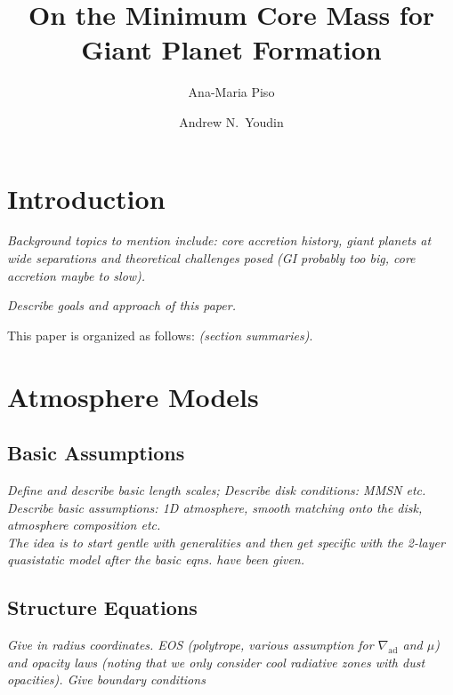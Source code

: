 \documentclass[apj]{emulateapj}
\newcommand{\emgr}[1]{\emph{ \color{gray} #1}}
\begin{document}



\title{On the Minimum Core Mass for Giant Planet Formation}
\author{Ana-Maria Piso}
\author{Andrew N.\ Youdin}

\section{Introduction}
\emgr{Background topics to mention include: core accretion history, giant planets at wide separations and theoretical challenges posed (GI probably too big, core accretion maybe to slow).}

\emgr{Describe goals and approach of this paper.}

This paper is organized as follows: \emgr{(section summaries)}.


\section{Atmosphere Models}\label{sec:model}

\subsection{Basic Assumptions}
\emgr{ Define and describe basic length scales; Describe disk conditions: MMSN etc. Describe basic assumptions: 1D atmosphere, smooth matching onto the disk, atmosphere composition etc.  \\
The idea is to start gentle with generalities and then get specific with the 2-layer quasistatic model after the basic eqns. have been given.}


\subsection{Structure Equations}
\emgr{Give in radius coordinates. EOS (polytrope, various assumption for $\nabla_{\mathrm{ad}}$ and $\mu$) and opacity laws (noting that we only consider cool radiative zones with dust opacities). Give boundary conditions}
\end{document}
